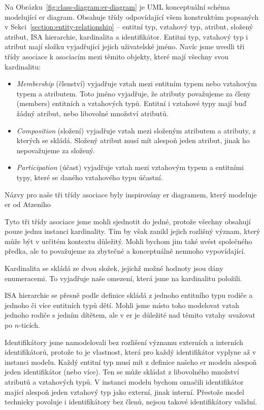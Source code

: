 Na Obrázku~\ref{fig:class-diagram:er-diagram} je \acrshort{UML} konceptuální schéma modelující \acrshort{er} diagram.
Obsahuje třídy odpovídající všem konstruktům popsaných v Sekci~\ref{section:entity-relationship} -- entitní typ, vztahový typ, atribut, složený atribut, ISA hierarchie, kardinalita a identifikátor.
Entitní typ, vztahový typ i atribut mají složku vyjadřující jejich uživatelské jméno.
Navíc jsme uvedli tři třídy asociace k asociacím mezi těmito objekty, které mají všechny svou kardinalitu:
\begin{itemize}
  \item \emph{Membership} (členství) vyjadřuje vztah mezi entitním typem nebo vztahovým typem a atributem.
        Toto jméno vyjadřuje, že atributy považujeme za členy (members) entitních a vztahových typů.
        Entitní i vztahové typy mají buď žádný atribut, nebo libovolné množství atributů.
  \item \emph{Composition} (složení) vyjadřuje vztah mezi složeným atributem a atributy, z kterých se skládá.
        Složený atribut musí mít alespoň jeden atribut, jinak ho nepovažujeme za složený.
  \item \emph{Participation} (účast) vyjadřuje vztah mezi vztahovým typem a entitními typy, které se daného vztahového typu účastní.
\end{itemize}

Názvy pro naše tři třídy asociace byly inspirovány \acrshort{er} diagramem, který modeluje \acrshort{er} od Atzeniho~\cite[Obr.~5.22]{atzeni_database_1999}

Tyto tři třídy asociace jsme mohli sjednotit do jedné, protože všechny obsahují pouze jednu instanci kardinality.
Tím by však zanikl jejich rozlišný význam, který může být v určitém kontextu důležitý.
Mohli bychom jim také uvést společného předka, ale to považujeme za zbytečné a konceptuálně nemnoho vypovídající.

Kardinalita se skládá ze dvou složek, jejichž možné hodnoty jsou dány enumeracemi.
To vyjadřuje naše omezení, která jsme na kardinalitu položili.

ISA hierarchie se přesně podle definice skládá z jednoho entitního typu rodiče a jednoho či více entitních typů dětí.
Mohli jsme místo toho modelovat vztah jednoho rodiče s jedním dítětem, ale v \acrshort{er} je důležité nad těmito vztahy uvažovat po $n$-ticích.

Identifikátory jsme namodelovali bez rozlišení významu externích a interních identifikátorů, protože to je vlastnost, která pro každý identifikátor vyplyne až v instanci modelu.
Každý entitní typ musí mít z definice našeho \acrshort{er} modelu alespoň jeden identifikátor (nebo více).
Ten se může skládat z libovolného množství atributů a vztahových typů.
V instanci modelu bychom označili identifikátor mající alespoň jeden vztahový typ jako externí, jinak interní.
Přestože model technicky povoluje i identifikátory bez členů, nejsou takové identifikátory validní.

